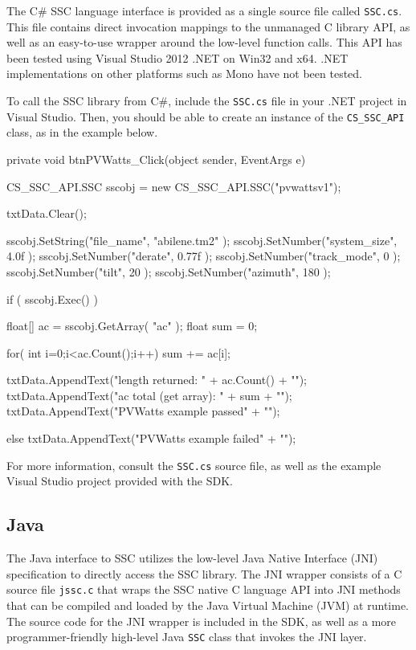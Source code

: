 \documentclass{article}
\begin{document}
The C\# SSC language interface is provided as a single source file called \texttt{SSC.cs}.  This file contains direct invocation mappings to the unmanaged C library API, as well as an easy-to-use wrapper around the low-level function calls.  This API has been tested using Visual Studio 2012 .NET on Win32 and x64.  .NET implementations on other platforms such as Mono have not been tested.

To call the SSC library from C\#, include the \texttt{SSC.cs} file in your .NET project in Visual Studio.  Then, you should be able to create an instance of the \texttt{CS\_SSC\_API} class, as in the example below.

\begin{verbatimtab}[4]
private void btnPVWatts_Click(object sender, EventArgs e)
{
	CS_SSC_API.SSC sscobj = new CS_SSC_API.SSC("pvwattsv1");

	txtData.Clear();

	sscobj.SetString("file_name", "abilene.tm2" );
	sscobj.SetNumber("system_size", 4.0f );
	sscobj.SetNumber("derate", 0.77f );
	sscobj.SetNumber("track_mode", 0 );
	sscobj.SetNumber("tilt", 20 );
	sscobj.SetNumber("azimuth", 180 );

	if ( sscobj.Exec() )
	{
		float[] ac = sscobj.GetArray( "ac" );
		float sum = 0;
	
		for( int i=0;i<ac.Count();i++)
		{
			sum += ac[i];
		}

		txtData.AppendText("length returned: " + ac.Count() + "\n");
		txtData.AppendText("ac total (get array): " + sum + "\n");
		txtData.AppendText("PVWatts example passed" + "\n");
	}
	else
	{
		txtData.AppendText("PVWatts example failed" + "\n");
	}
}

\end{verbatimtab}

For more information, consult the \texttt{SSC.cs} source file, as well as the example Visual Studio project provided with the SDK.

\subsection{Java}

The Java interface to SSC utilizes the low-level Java Native Interface (JNI) specification to directly access the SSC library.  The JNI wrapper consists of a C source file \texttt{jssc.c} that wraps the SSC native C language API into JNI methods that can be compiled and loaded by the Java Virtual Machine (JVM) at runtime.  The source code for the JNI wrapper is included in the SDK, as well as a more programmer-friendly high-level Java \texttt{SSC} class that invokes the JNI layer.
\end{document}
